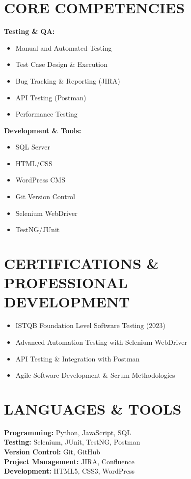 \documentclass[11pt,a4paper]{article}
\begin{document}
\section*{CORE COMPETENCIES}
\textbf{Testing \& QA:}
\begin{itemize}[leftmargin=*,nosep]
\item Manual and Automated Testing
\item Test Case Design \& Execution
\item Bug Tracking \& Reporting (JIRA)
\item API Testing (Postman)
\item Performance Testing
\end{itemize}

\textbf{Development \& Tools:}
\begin{itemize}[leftmargin=*,nosep]
\item SQL Server
\item HTML/CSS
\item WordPress CMS
\item Git Version Control
\item Selenium WebDriver
\item TestNG/JUnit
\end{itemize}

\section*{CERTIFICATIONS \& PROFESSIONAL DEVELOPMENT}
\begin{itemize}[leftmargin=*,nosep]
\item ISTQB Foundation Level Software Testing (2023)
\item Advanced Automation Testing with Selenium WebDriver
\item API Testing \& Integration with Postman
\item Agile Software Development \& Scrum Methodologies
\end{itemize}

\section*{LANGUAGES \& TOOLS}
\textbf{Programming:} Python, JavaScript, SQL\\
\textbf{Testing:} Selenium, JUnit, TestNG, Postman\\
\textbf{Version Control:} Git, GitHub\\
\textbf{Project Management:} JIRA, Confluence\\
\textbf{Development:} HTML5, CSS3, WordPress
\end{document}
